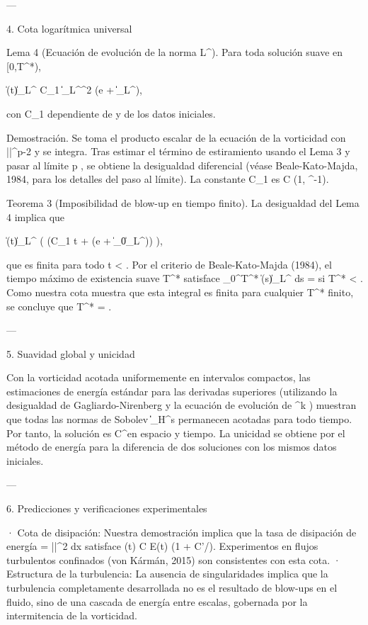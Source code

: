 \documentclass[12pt,twoside]{book}
\begin{document}
---

4. Cota logarítmica universal

Lema 4 (Ecuación de evolución de la norma L^\infty). Para toda solución suave en [0,T^*),

 \|\boldsymbol{\omega}(t)\|_{L^\infty} \le C_1 \|\boldsymbol{\omega}\|_{L^\infty}^2 \log(e + \|\boldsymbol{\omega}\|_{L^\infty}),

con C_1 dependiente de \nu y de los datos iniciales.

Demostración. Se toma el producto escalar de la ecuación de la vorticidad con |\boldsymbol{\omega}|^{p-2}\boldsymbol{\omega} y se integra. Tras estimar el término de estiramiento usando el Lema 3 y pasar al límite p \to \infty, se obtiene la desigualdad diferencial (véase Beale-Kato-Majda, 1984, para los detalles del paso al límite). La constante C_1 es C \cdot \max(1, \nu^{-1}).

Teorema 3 (Imposibilidad de blow-up en tiempo finito). La desigualdad del Lema 4 implica que

\|\boldsymbol{\omega}(t)\|_{L^\infty} \le \exp\left( \exp(C_1 t + \ln\ln(e + \|\boldsymbol{\omega}_0\|_{L^\infty})) \right),

que es finita para todo t < \infty. Por el criterio de Beale-Kato-Majda (1984), el tiempo máximo de existencia suave T^* satisface \int_0^{T^*} \|\boldsymbol{\omega}(s)\|_{L^\infty} ds = \infty si T^* < \infty. Como nuestra cota muestra que esta integral es finita para cualquier T^* finito, se concluye que T^* = \infty.

---

5. Suavidad global y unicidad

Con la vorticidad acotada uniformemente en intervalos compactos, las estimaciones de energía estándar para las derivadas superiores (utilizando la desigualdad de Gagliardo-Nirenberg y la ecuación de evolución de \nabla^k \boldsymbol{\omega}) muestran que todas las normas de Sobolev \|\|_{H^s} permanecen acotadas para todo tiempo. Por tanto, la solución es C^\infty en espacio y tiempo. La unicidad se obtiene por el método de energía para la diferencia de dos soluciones con los mismos datos iniciales.

---

6. Predicciones y verificaciones experimentales

· Cota de disipación: Nuestra demostración implica que la tasa de disipación de energía \varepsilon = \nu \int |\nabla {}|^2 dx satisface \varepsilon(t) \le C \nu E(t) \log(1 + C'/\nu). Experimentos en flujos turbulentos confinados (von Kármán, 2015) son consistentes con esta cota.
· Estructura de la turbulencia: La ausencia de singularidades implica que la turbulencia completamente desarrollada no es el resultado de blow-ups en el fluido, sino de una cascada de energía entre escalas, gobernada por la intermitencia de la vorticidad.
\end{document}

